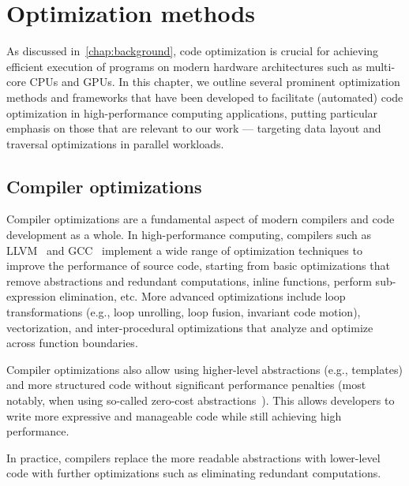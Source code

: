 \chapter{Optimization methods}\label{chap:optimization-methods}

As discussed in~\cref{chap:background}, code optimization is crucial for achieving efficient execution of programs on modern hardware architectures such as multi-core CPUs and GPUs.
In this chapter, we outline several prominent optimization methods and frameworks that have been developed to facilitate (automated) code optimization in high-performance computing applications, putting particular emphasis on those that are relevant to our work --- targeting data layout and traversal optimizations in parallel workloads.



\section{Compiler optimizations}

Compiler optimizations are a fundamental aspect of modern compilers and code development as a whole. In high-performance computing, compilers such as LLVM~\cite{lattner2004llvm} and GCC~\cite{gcc} implement a wide range of optimization techniques to improve the performance of source code, starting from basic optimizations that remove abstractions and redundant computations, inline functions, perform sub-expression elimination, etc. More advanced optimizations include loop transformations (e.g., loop unrolling, loop fusion, invariant code motion), vectorization, and inter-procedural optimizations that analyze and optimize across function boundaries.

Compiler optimizations also allow using higher-level abstractions (e.g., \cpp templates) and more structured code without significant performance penalties (most notably, when using so-called zero-cost abstractions~\cite{stroustrup2012foundations}). This allows developers to write more expressive and manageable code while still achieving high performance.

In practice, compilers replace the more readable abstractions with lower-level code with further optimizations such as eliminating redundant computations.

